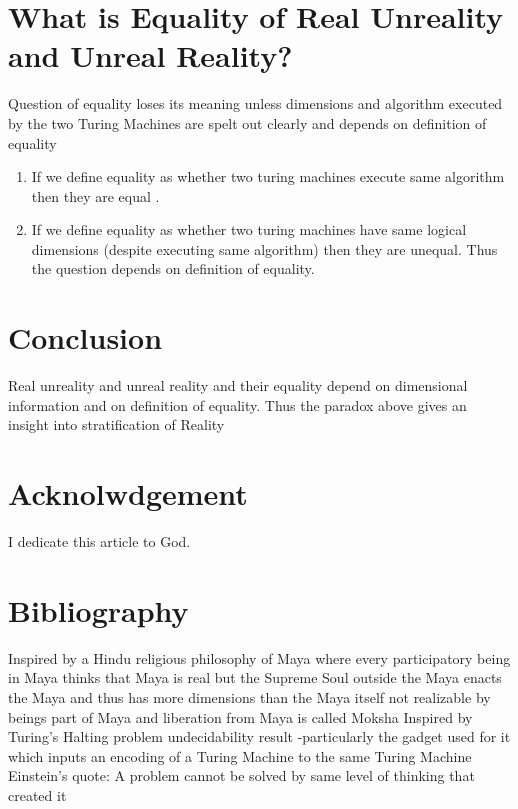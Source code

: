 \documentclass[11pt,onecolumn]{article}
\begin{document}
\section{What is Equality of Real Unreality and Unreal Reality?}

Question of equality loses its meaning unless dimensions and algorithm executed by the two Turing Machines are spelt out clearly and depends on definition of equality
\begin{enumerate}
\item If we define equality as whether two turing machines execute same algorithm then they are equal .
\item If we define equality as whether two turing machines have same logical dimensions (despite executing same algorithm) then they are unequal. Thus the question depends on definition of equality. 
\end{enumerate}

\section{Conclusion}

Real unreality and unreal reality and their equality depend on dimensional information and on definition of equality. Thus the paradox above gives an insight into stratification of Reality

\section{Acknolwdgement}

I dedicate this article to God.

\section{Bibliography}
\begin{thebibliography}{99}
 Inspired by a Hindu religious philosophy of Maya where every participatory being in Maya thinks that Maya is real but the Supreme Soul outside the Maya enacts the Maya and thus has more dimensions than the Maya itself not realizable by beings part of Maya and liberation from Maya is called Moksha
 Inspired by Turing's Halting problem undecidability result -particularly the gadget used for it which inputs an encoding of a Turing Machine to the same Turing Machine
 Einstein's quote: A problem cannot be solved by same level of thinking that created it
\end{thebibliography}
\end{document}
